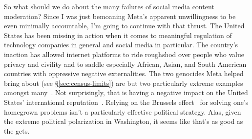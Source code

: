 So what should we do about the many failures of social media content moderation?
Since I was just bemoaning Meta's apparent unwillingness to be even minimally
accountable, I'm going to continue with that thrust. The United States has been
missing in action when it comes to meaningful regulation of technology companies
in general and social media in particular. The country's inaction has allowed
internet platforms to ride roughshod over people who value privacy and civility
and to saddle especially African, Asian, and South American countries with
oppressive negative externalities. The two genocides Meta helped bring about
(see \S\ref{sec:census-limits}) are but two particularly extreme examples
amongst
many~\cite{DwoskinNewmyerea2021,ElliottChristopherea2021a,FrenkelAlba2021,Iyengar2021,MacSilverman2020,Morris2021,Newton2021,Satariano2021,Scott2021,SilvermanMacea2020,Simonite2021,WongEllisPetersen2021,WongErnst2021,WongHarding2021,ZahrzewskiDeVynckea2021}.
Not surprisingly, that is having a negative impact on the United States'
international reputation~\cite{GeltzerGhosh2018}. Relying on the Brussels
effect~\cite{Bradford2020} for solving one's homegrown problems isn't a
particularly effective political strategy. Alas, given the extreme political
polarization in Washington, it seems like that's as good as the  gets.

